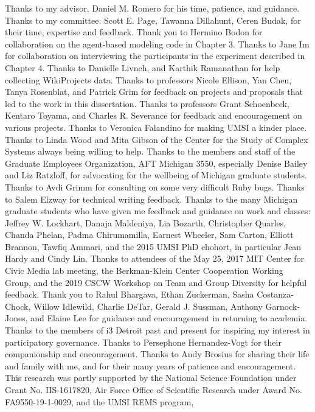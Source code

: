 Thanks to my advisor, Daniel M. Romero for his time, patience, and guidance.
Thanks to my committee:
Scott E. Page,
Tawanna Dillahunt,
Ceren Budak,
for their time, expertise and feedback.
Thank you to Hermino Bodon for collaboration on the agent-based modeling code in Chapter 3.
Thanks to Jane Im for collaboration on interviewing the participants in the experiment described in Chapter 4.
Thanks to Danielle Livneh, and Karthik Ramanathan for help collecting WikiProjects data.
Thanks to professors Nicole Ellison, Yan Chen, Tanya Rosenblat, and Patrick Grim for feedback on projects and proposals that led to the work in this dissertation.
Thanks to professors Grant Schoenbeck, Kentaro Toyama, and Charles R. Severance for feedback and encouragement on various projects.
Thanks to Veronica Falandino for making UMSI a kinder place.
Thanks to Linda Wood and Mita Gibson of the Center for the Study of Complex Systems always being willing to help.
Thanks to the members and staff of the Graduate Employees Organization, AFT Michigan 3550, especially Denise Bailey and Liz Ratzloff, for advocating for the wellbeing of Michigan graduate students.
Thanks to Avdi Grimm for consulting on some very difficult Ruby bugs.
Thanks to Salem Elzway for technical writing feedback.
Thanks to the many Michigan graduate students who have given me feedback and guidance on work and classes:
Jeffrey W. Lockhart,
Danaja Maldeniya,
Lia Bozarth,
Christopher Quarles,
Chanda Phelan,
Padma Chirumamilla,
Earnest Wheeler,
Sam Carton,
Elliott Brannon,
Tawfiq Ammari,
and the 2015 UMSI PhD chohort,
in particular Jean Hardy and Cindy Lin.
Thanks to attendees of the May 25, 2017 MIT Center for Civic Media lab meeting,
the Berkman-Klein Center Cooperation Working Group,
and the 2019 CSCW Workshop on Team and Group Diversity
for helpful feedback.
Thank you to
Rahul Bhargava,
Ethan Zuckerman,
Sasha Costanza-Chock,
Willow Idlewild,
Charlie DeTar,
Gerald J. Sussman,
Anthony Garnock-Jones,
and Elaine Lee
for guidance and encouragement in returning to academia.
Thanks to the members of i3 Detroit past and present for inspiring my interest in participatory governance.
Thanks to Persephone Hernandez-Vogt for their companionship and encouragement.
Thanks to Andy Brosius for sharing their life and family with me, and for their many years of patience and encouragement.
This research was partly supported by
the National Science Foundation under Grant No. IIS-1617820,
Air Force Office of Scientific Research under Award No. FA9550-19-1-0029,
and the UMSI REMS program,
